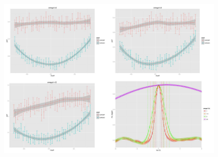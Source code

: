 \begin{figure}
\includegraphics[width=\linewidth]{Figures/Final/C-syntheticdata-model_perf.jpg}

\end{figure}
